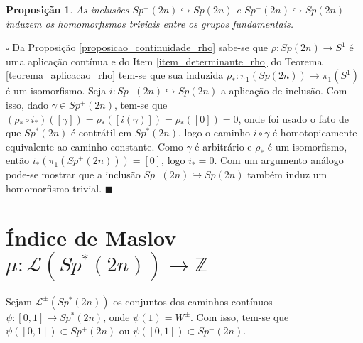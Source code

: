 \documentclass[12pt]{book}
\newtheorem{proposicao}[teorema]{Proposição}
\newenvironment{prova}[1]{$\square$ #1}{\hfill$\blacksquare$}
\newcommand{\caminhos}{\mathcal{L}}
\newcommand{\caminhossempontobase}[1]{\caminhos(#1)}
\newcommand{\circulo}{S^{1}}
\newcommand{\classe}[1]{[#1]}
\newcommand{\grupofundamental}[1]{\pi_{1}(#1)}
\newcommand{\gruposimpletico}[1]{Sp(#1)}
\newcommand{\gruposimpleticonaodegenerado}[1]{Sp^{#1}(2n)}
\newcommand{\inteiros}{\mathbb{Z}}
\newcommand{\intervalo}{[0,1]}
\begin{document}
	\begin{proposicao}\label{proposicao_homomorfismo_trivial_grupos_simpletico}
		As inclusões $\gruposimpleticonaodegenerado{+} \hookrightarrow \gruposimpletico{2n}$ e $\gruposimpleticonaodegenerado{-} \hookrightarrow \gruposimpletico{2n}$ induzem os homomorfismos triviais entre os grupos fundamentais.
	\end{proposicao}
	\begin{prova}
		Da Proposição \ref{proposicao_continuidade_rho} sabe-se que $\rho: \gruposimpletico{2n}\to \circulo$ é uma aplicação contínua e do Item \ref{item_determinante_rho} do Teorema \ref{teorema_aplicacao_rho} tem-se que sua induzida $\rho_{*}: \grupofundamental{\gruposimpletico{2n}} \to \grupofundamental{\circulo}$ é um isomorfismo. Seja $i:\gruposimpleticonaodegenerado{+} \hookrightarrow \gruposimpletico{2n}$ a aplicação de inclusão. Com isso, dado $\gamma\in \gruposimpleticonaodegenerado{+}$, tem-se que $(\rho_{*}\circ i_{*})(\classe{\gamma} )= \rho_{*}(\classe{i(\gamma)}) = \rho_{*}(\classe{0}) = 0$, onde foi usado o fato de que $\gruposimpleticonaodegenerado{*}$ é contrátil em $\gruposimpleticonaodegenerado{*}$, logo o caminho $i\circ\gamma$ é homotopicamente equivalente ao caminho constante. Como $\gamma$ é arbitrário e $\rho_{*}$ é um isomorfismo, então $i_{*}(\grupofundamental{\gruposimpleticonaodegenerado{+}}) = [0]$, logo $i_{*} = 0$. Com um argumento análogo pode-se mostrar que a inclusão $\gruposimpleticonaodegenerado{-} \hookrightarrow \gruposimpletico{2n}$ também induz um homomorfismo trivial.
	\end{prova}
		
	
	\section{Índice de Maslov $\mu : \caminhossempontobase{\gruposimpleticonaodegenerado{*}} \to \inteiros$}\label{secao_indice_maslov}
	
	Sejam $\caminhos^{\pm}(\gruposimpleticonaodegenerado{*})$ os conjuntos dos caminhos contínuos $\psi:\intervalo \to \gruposimpleticonaodegenerado{*}$, onde $\psi(1) = W^{\pm}$. Com isso, tem-se que $\psi(\intervalo) \subset \gruposimpleticonaodegenerado{+}$ ou $\psi(\intervalo) \subset \gruposimpleticonaodegenerado{-}$. 
	
	
	
\end{document}
